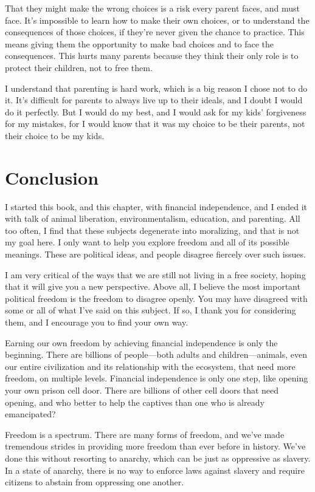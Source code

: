That they might make the wrong choices is a risk every parent faces, and must face. It's impossible to learn how to make their own choices, or to understand the consequences of those choices, if they're never given the chance to practice. This means giving them the opportunity to make bad choices and to face the consequences. This hurts many parents because they think their only role is to protect their children, not to free them.

I understand that parenting is hard work, which is a big reason I chose not to do it. It's difficult for parents to always live up to their ideals, and I doubt I would do it perfectly. But I would do my best, and I would ask for my kids' forgiveness for my mistakes, for I would know that it was my choice to be their parents, not their choice to be my kids.

\section{Conclusion}
I started this book, and this chapter, with financial independence, and I ended it with talk of animal liberation, environmentalism, education, and parenting. All too often, I find that these subjects degenerate into moralizing, and that is not my goal here. I only want to help you explore freedom and all of its possible meanings. These are political ideas, and people disagree fiercely over such issues.

I am very critical of the ways that we are still not living in a free society, hoping that it will give you a new perspective. Above all, I believe the most important political freedom is the freedom to disagree openly. You may have disagreed with some or all of what I've said on this subject. If so, I thank you for considering them, and I encourage you to find your own way.

Earning our own freedom by achieving financial independence is only the beginning. There are billions of people---both adults and children---animals, even our entire civilization and its relationship with the ecosystem, that need more freedom, on multiple levels. Financial independence is only one step, like opening your own prison cell door. There are billions of other cell doors that need opening, and who better to help the captives than one who is already emancipated?

Freedom is a spectrum. There are many forms of freedom, and we've made tremendous strides in providing more freedom than ever before in history. We've done this without resorting to anarchy, which can be just as oppressive as slavery. In a state of anarchy, there is no way to enforce laws against slavery and require citizens to abstain from oppressing one another.

